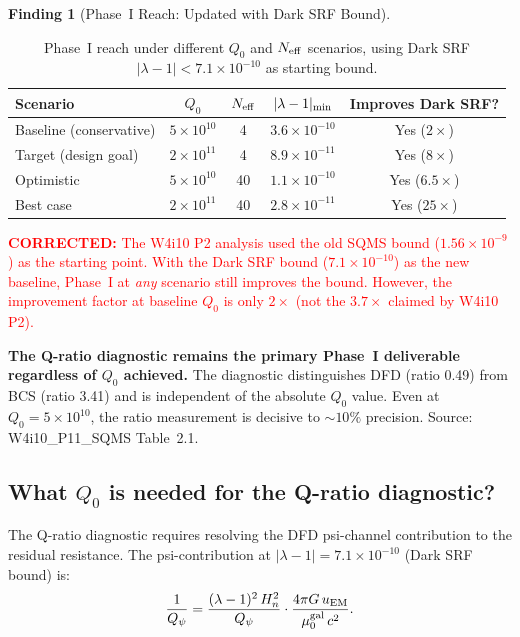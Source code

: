 \documentclass[11pt]{article}
\newcommand{\lam}{\lambda}
\newcommand{\lbone}{|\lambda - 1|}
\newcommand{\Qpsi}{Q_\psi}
\newcommand{\ee}[1]{\times 10^{#1}}
\newcommand{\Heff}{H_n}
\newcommand{\corrected}[1]{\textcolor{red}{\textbf{CORRECTED:} #1}}
\theoremstyle{definition}
\newtheorem{finding}[theorem]{Finding}
\theoremstyle{remark}
\begin{document}
\begin{finding}[Phase~I Reach: Updated with Dark SRF Bound]
\label{find:phase_I_updated}

\begin{table}[H]
\centering
\caption{Phase~I reach under different $Q_0$ and $N_{\rm eff}$ scenarios,
using Dark SRF $\lbone < 7.1\ee{-10}$ as starting bound.}
\label{tab:phase_I_reach}
\renewcommand{\arraystretch}{1.3}
\begin{tabular}{@{}lcccc@{}}
\toprule
\textbf{Scenario} & $Q_0$ & $N_{\rm eff}$ &
  $\lbone_{\rm min}$ & \textbf{Improves Dark SRF?} \\
\midrule
\rowcolor{rowlo}
Baseline (conservative) & $5\ee{10}$ & 4 & $3.6\ee{-10}$ & Yes ($2\times$) \\
\rowcolor{rowhi}
Target (design goal) & $2\ee{11}$ & 4 & $8.9\ee{-11}$ & Yes ($8\times$) \\
\rowcolor{rowhi}
Optimistic & $5\ee{10}$ & 40 & $1.1\ee{-10}$ & Yes ($6.5\times$) \\
\rowcolor{rowhi}
Best case & $2\ee{11}$ & 40 & $2.8\ee{-11}$ & Yes ($25\times$) \\
\bottomrule
\end{tabular}
\end{table}

\corrected{The W4i10 P2 analysis used the old SQMS bound ($1.56\ee{-9}$)
as the starting point. With the Dark SRF bound ($7.1\ee{-10}$) as
the new baseline, Phase~I at \textit{any} scenario still improves
the bound. However, the improvement factor at baseline $Q_0$ is
only $2\times$ (not the $3.7\times$ claimed by W4i10 P2).}

\textbf{The Q-ratio diagnostic remains the primary Phase~I deliverable
regardless of $Q_0$ achieved.} The diagnostic distinguishes DFD
(ratio 0.49) from BCS (ratio 3.41) and is independent of the absolute
$Q_0$ value. Even at $Q_0 = 5\ee{10}$, the ratio measurement is decisive
to $\sim 10\%$ precision. Source: W4i10\_P11\_SQMS Table~2.1.
\end{finding}

\subsection{What $Q_0$ is needed for the Q-ratio diagnostic?}

The Q-ratio diagnostic requires resolving the DFD psi-channel
contribution to the residual resistance. The psi-contribution
at $\lbone = 7.1\ee{-10}$ (Dark SRF bound) is:
\begin{equation}
\frac{1}{Q_\psi} = \frac{(\lam-1)^2\,\Heff^2}{\Qpsi}\cdot
\frac{4\pi G\,u_{\rm EM}}{\mu_0^{\rm gal}\,c^2}.
\end{equation}
\end{document}
